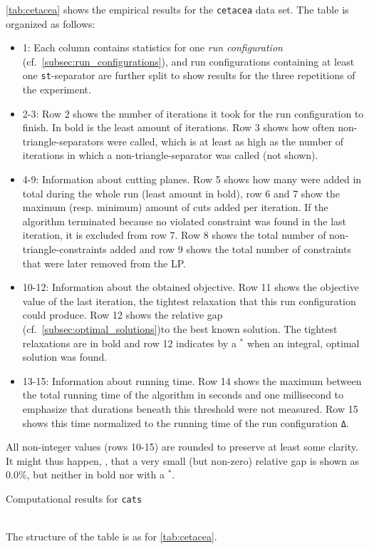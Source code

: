 \begin{landscape}
\cref{tab:cetacea} shows the empirical results for the \texttt{cetacea} data set.
The table is organized as follows:
\begin{itemize}
	\item 1: Each column contains statistics for one \textit{run configuration} (cf.\ \cref{subsec:run_configurations}),
		and run configurations containing at least one \texttt{st}-separator are further split to show results for the three repetitions of the experiment.
	\item 2-3: Row 2 shows the number of iterations it took for the run configuration to finish. 
		In bold is the least amount of iterations.
		Row 3 shows how often non-triangle-separators were called, which is at least as high as the number of iterations in which a non-triangle-separator was called (not shown).
	\item 4-9: Information about cutting planes. 
		Row 5 shows how many were added in total during the whole run (least amount in bold),
		row 6 and 7 show the maximum (resp. minimum) amount of cuts added per iteration.
		If the algorithm terminated because no violated constraint was found in the last iteration, it is excluded from row 7.
		Row 8 shows the total number of non-triangle-constraints added
		and row 9 shows the total number of constraints that were later removed from the LP.
	\item 10-12: Information about the obtained objective.
		Row 11 shows the objective value of the last iteration, \ie the tightest relaxation that this run configuration could produce.
		Row 12 shows the relative gap (cf.\ \cref{subsec:optimal_solutions})to the best known solution.
		The tightest relaxations are in bold and row 12 indicates by a $^{*}$ when an integral, \ie optimal solution was found.
	\item 13-15: Information about running time.
		Row 14 shows the maximum between the total running time of the algorithm in seconds and one millisecond to emphasize that durations beneath this threshold were not measured.
		Row 15 shows this time normalized to the running time of the run configuration \texttt{Δ}.
\end{itemize}
All non-integer values (rows 10-15) are rounded to preserve at least some clarity.
It might thus happen, \eg, that a very small (but non-zero) relative gap is shown as $0.0\%$, but neither in bold nor with a $^{*}$.

\newpage

\begin{table}[p]
\centering
\caption{Computational results for \texttt{cats}}
\bigskip
{}
\label{tab:cats}
\\[10pt]
The structure of the table is as for \cref{tab:cetacea}.
\end{table}


\end{landscape}
